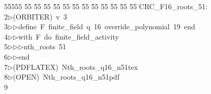 %
%
\begin{tabbing}
55555 \= 55 \= 55 \= 55 \= 55 \= 55 \= 55 \= 55 \= 55 \= 55 \= 55 \= 55 \= 55 \= \>CRC\_F16\_roots\_51:\\[0pt]
2\>$\triangleright$\>(ORBITER)\ v\ 3\ \\[0pt]
3\>$\triangleright$\>$\triangleright$\>define\ F\ finite\_field\ q\ 16\ override\_polynomial\ 19\ end\ \\[0pt]
4\>$\triangleright$\>$\triangleright$\>with\ F\ do\ finite\_field\_activity\ \\[0pt]
5\>$\triangleright$\>$\triangleright$\>$\triangleright$\>nth\_roots\ 51\ \\[0pt]
6\>$\triangleright$\>$\triangleright$\>end\\[0pt]
7\>$\triangleright$\>(PDFLATEX)\ Nth\_roots\_q16\_n51tex\\[0pt]
8\>$\triangleright$\>(OPEN)\ Nth\_roots\_q16\_n51pdf\\[0pt]
9\>\end{tabbing}
